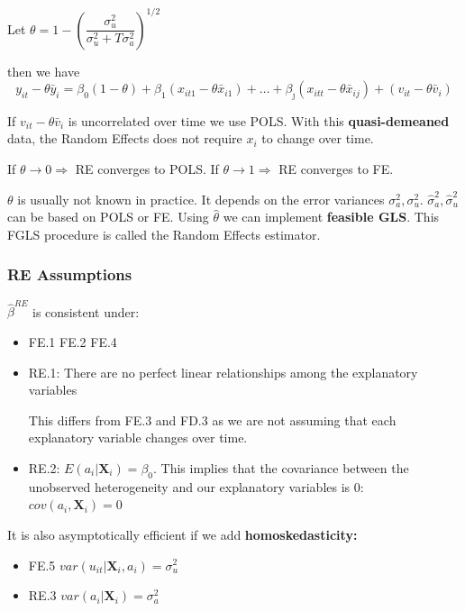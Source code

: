 \documentclass[11pt]{article}
\begin{document}
Let $\theta=1-\left(\dfrac{\sigma_u^2}{\sigma_u^2+T\sigma_a^2}\right)^{1/2}$

then we have
\begin{equation}
y_{i t}-\theta \bar{y}_i=\beta_0(1-\theta)+\beta_1\left(x_{i t 1}-\theta \bar{x}_{i 1}\right)+\ldots+\beta_{\jmath}\left(x_{i t t}-\theta \bar{x}_{i j}\right)+\left(v_{i t}-\theta \bar{v}_i\right)
\end{equation}

If $v_{it} - \theta\bar{v}_i$ is uncorrelated over time we use POLS. With this \textbf{quasi-demeaned} data, the Random Effects does not require $x_i$ to change over time.

\begin{note}
    If $\theta\rightarrow0\Rightarrow$ RE converges to POLS. If $\theta\rightarrow1\Rightarrow$ RE converges to FE.
\end{note}

$\theta$ is usually not known in practice. It depends on the error variances $\sigma_{a}^2, \sigma_u^2$. $\hat{\sigma}_{a}^2, \hat{\sigma}_u^2$ can be based on POLS or FE. Using $\hat{\theta}$ we can implement \textbf{feasible GLS}. This FGLS procedure is called the Random Effects estimator.
\begin{definition}
\subsubsection{RE Assumptions}

$\hat{\beta}^{RE}$ is consistent under:
\begin{itemize}
    \item FE.1 FE.2 FE.4
    \item RE.1: There are no perfect linear relationships among the explanatory variables
    \begin{note}
        This differs from FE.3 and FD.3 as we are not assuming that each explanatory variable changes over time.
    \end{note}
    \item RE.2: $E(a_i|\boldsymbol{X}_i)=\beta_0$. This implies that the covariance between the unobserved heterogeneity and our explanatory variables is 0: $cov(a_i, \boldsymbol{X}_i)=0$
\end{itemize}

It is also asymptotically efficient if we add \textbf{homoskedasticity:}
\begin{itemize}
    \item FE.5 $var(u_{it}|\boldsymbol{X}_i,a_i)=\sigma_u^2$
    \item RE.3 $var(a_i|\boldsymbol{X}_i)=\sigma_a^2$
\end{itemize}
\end{definition}
\end{document}
